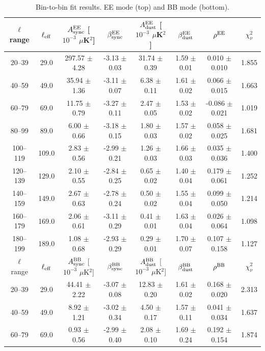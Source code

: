 \begin{table}[htbp]
\centering
\caption{Bin-to-bin fit results. EE mode (top) and BB mode (bottom).}
\label{tab:bin_to_bin_results}
\begin{tabular}{c c c c c c c c}
\hline\hline
$\ell$ range & $\ell_{\rm eff}$ & $A^{\rm EE}_{\rm sync}$ [$10^{-3}$ $\mu$K$^2$] & $\beta^{\rm EE}_{\rm sync}$ & $A^{\rm EE}_{\rm dust}$ [$10^{-3}$ $\mu$K$^2$] & $\beta^{\rm EE}_{\rm dust}$ & $\rho^{\rm EE}$ & $\chi^2_\nu$ \\
\hline
20--39 & 29.0 & 297.57 $\pm$ 4.28 & -3.13 $\pm$ 0.03 & 31.74 $\pm$ 0.39 & 1.59 $\pm$ 0.01 & 0.010 $\pm$ 0.010 & 1.855 \\
40--59 & 49.0 & 35.94 $\pm$ 1.36 & -3.11 $\pm$ 0.07 & 6.38 $\pm$ 0.11 & 1.61 $\pm$ 0.02 & 0.066 $\pm$ 0.015 & 1.663 \\
60--79 & 69.0 & 11.75 $\pm$ 0.79 & -3.27 $\pm$ 0.11 & 2.47 $\pm$ 0.05 & 1.53 $\pm$ 0.02 & -0.086 $\pm$ 0.021 & 1.019 \\
80--99 & 89.0 & 6.00 $\pm$ 0.66 & -3.18 $\pm$ 0.15 & 1.80 $\pm$ 0.03 & 1.57 $\pm$ 0.02 & 0.058 $\pm$ 0.025 & 1.681 \\
100--119 & 109.0 & 2.83 $\pm$ 0.56 & -2.99 $\pm$ 0.21 & 1.26 $\pm$ 0.03 & 1.66 $\pm$ 0.03 & 0.035 $\pm$ 0.036 & 1.400 \\
120--139 & 129.0 & 2.10 $\pm$ 0.55 & -2.84 $\pm$ 0.25 & 0.65 $\pm$ 0.02 & 1.40 $\pm$ 0.04 & 0.179 $\pm$ 0.061 & 1.252 \\
140--159 & 149.0 & 2.67 $\pm$ 0.63 & -2.78 $\pm$ 0.24 & 0.50 $\pm$ 0.02 & 1.55 $\pm$ 0.04 & 0.099 $\pm$ 0.050 & 1.214 \\
160--179 & 169.0 & 2.06 $\pm$ 0.61 & -3.11 $\pm$ 0.29 & 0.41 $\pm$ 0.01 & 1.63 $\pm$ 0.04 & 0.026 $\pm$ 0.064 & 1.098 \\
180--199 & 189.0 & 1.08 $\pm$ 0.68 & -2.93 $\pm$ 0.29 & 0.29 $\pm$ 0.01 & 1.70 $\pm$ 0.07 & 0.107 $\pm$ 0.158 & 1.127 \\
\hline
$\ell$ range & $\ell_{\rm eff}$ & $A^{\rm BB}_{\rm sync}$ [$10^{-3}$ $\mu$K$^2$] & $\beta^{\rm BB}_{\rm sync}$ & $A^{\rm BB}_{\rm dust}$ [$10^{-3}$ $\mu$K$^2$] & $\beta^{\rm BB}_{\rm dust}$ & $\rho^{\rm BB}$ & $\chi^2_\nu$ \\
\hline
20--39 & 29.0 & 44.41 $\pm$ 2.22 & -3.07 $\pm$ 0.08 & 12.83 $\pm$ 0.20 & 1.61 $\pm$ 0.02 & 0.168 $\pm$ 0.020 & 2.313 \\
40--59 & 49.0 & 8.92 $\pm$ 1.21 & -3.02 $\pm$ 0.34 & 4.50 $\pm$ 0.17 & 1.57 $\pm$ 0.11 & 0.041 $\pm$ 0.034 & 1.637 \\
60--79 & 69.0 & 0.93 $\pm$ 0.56 & -2.99 $\pm$ 0.40 & 2.08 $\pm$ 0.10 & 1.69 $\pm$ 0.24 & 0.192 $\pm$ 0.154 & 1.874 \\

\end{tabular}
\end{table}
